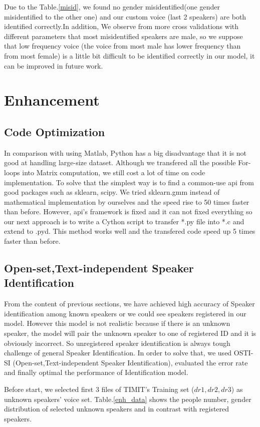 \documentclass[12pt,DIV14,BCOR12mm,a4paper,footinclude=false,headinclude,parskip=half-,twoside,openright,cleardoublepage=empty,toc=index,bibliography=totoc,listof=totoc]{scrreprt}
\numberwithin{equation}{chapter}
\begin{document}
Due to the Table.\ref{misid}, we found no gender misidentified(one gender misidentified to the other one) and our custom voice (last 2 speakers) are both identified correctly.In addition, We observe from more cross validations with different parameters that most misidentified speakers are male, so we suppose that low frequency voice (the voice from most male has lower frequency than from most female) is a little bit difficult to be identified correctly in our model, it can be improved in future work.

\section{Enhancement}
\subsection{Code Optimization}
In comparison with using Matlab, Python has a big disadvantage that it is not good at handling large-size dataset. Although we transfered all the possible For-loops into Matrix computation, we still cost a lot of time on code implementation. To solve that the simplest way is to find a common-use api from good packages such as sklearn, scipy. We tried sklearn.gmm instead of mathematical implementation by ourselves and the speed rise to 50 times faster than before. However, api's framework is fixed and it can not fixed everything so our next approach is to write a Cython script to transfer *.py file into *.c and extend to .pyd. This method works well and the transfered code speed up 5 times faster than before.
\subsection{Open-set,Text-independent Speaker Identification}
From the content of previous sections, we have achieved high accuracy of Speaker identification among known speakers or we could see speakers registered in our model. However this model is not realistic because if there is an unknown speaker, the model will pair the unknown speaker to one of registered ID and it is obviously incorrect. So unregistered speaker identification is always tough challenge of general Speaker Identification. In order to solve that, we used OSTI-SI (Open-set,Text-independent Speaker Identification), evaluated the error rate and finally optimal the performance of Identification model.

Before start, we selected first 3 files of TIMIT's Training set ($dr1,dr2,dr3$) as unknown speakers' voice set. Table.\ref{enh_data} shows the people number, gender distribution of selected unknown speakers and in contrast with registered speakers.
\end{document}
